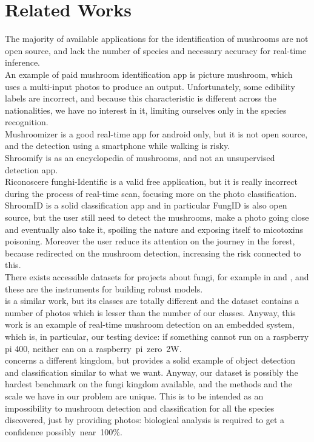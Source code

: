 \documentclass[conference]{IEEEtran}
\begin{document}
\section{Related Works}
The majority of available applications for the identification of mushrooms are not open source, and lack the number of species and necessary accuracy for real-time inference.\\
An example of paid mushroom identification app is picture mushroom, which uses a multi-input photos to produce an output. Unfortunately, some edibility labels are incorrect, and because this characteristic is different across the nationalities, we have no interest in it, limiting ourselves only in the species recognition\cite{book}.\\
Mushroomizer is a good real-time app for android only, but it is not open source, and the detection using a smartphone while walking is risky.\\
Shroomify is as an encyclopedia of mushrooms, and not an unsupervised detection app.\\
Riconoscere funghi-Identific is a valid free application, but it is really incorrect during the process of real-time scan, focusing more on the photo classification.\\
ShroomID is a solid classification app and in particular FungID is also open source, but the user still need to detect the mushrooms, make a photo going close and eventually also take it, spoiling the nature and exposing itself to micotoxins poisoning. Moreover the user reduce its attention on the journey in the forest, because redirected on the mushroom detection, increasing the risk connected to this.\\
There exists accessible datasets for projects about fungi, for example in \cite{kaggle_mushroom_datasets} and \cite{roboflow_mushroom_datasets}, and these are the instruments for building robust models.\\
\cite{bouganssa2024recognition} is a similar work, but its classes are totally different and the dataset contains a number of photos which is lesser than the number of our classes. Anyway, this work is an example of real-time mushroom detection on an embedded system, which is, in particular, our testing device: if something cannot run on a raspberry pi 400, neither can on a raspberry pi zero 2W.\\
\cite{shafik2024transfer} concerns a different kingdom, but provides a solid example of object detection and classification similar to what we want. Anyway, our dataset is possibly the hardest benchmark on the fungi kingdom available, and the methods and the scale we have in our problem are unique. This is to be intended as an impossibility to mushroom detection and classification for all the species discovered, just by providing photos: biological analysis is required to get a confidence possibly near 100\%.
\end{document}
